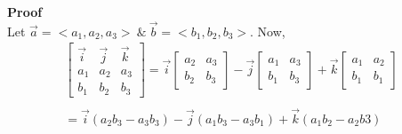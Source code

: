 \documentclass{article}
\begin{document}
  \textbf{Proof}\\
  Let $ \vec{ a } = < a_1, a_2, a_3> ~ \&~ \vec{ b } = < b_1, b_2, b_3>    $. Now,
  \[
    \begin{gathered}
    \begin{bmatrix}
      \vec{ i } & \vec{ j } & \vec{ k }\\
      a_1 &a_2 &a_3\\
      b_1 &b_2 &b_3
    \end{bmatrix}
    = \vec{ i } \begin{bmatrix}
      a_2 &a_3\\
      b_2 &b_3
    \end{bmatrix} - 
    \vec{ j } \begin{bmatrix}
      a_1 &a_3\\
      b_1 &b_3
    \end{bmatrix} + 
    \vec{ k } \begin{bmatrix}
      a_1 &a_2\\
      b_1 &b_1
    \end{bmatrix}\\
    ~\\
     = \vec{ i } (a_2b_3-a_3b_3) - \vec{ j } (a_1b_3 - a_3b_1) + \vec{ k }(a_1b_2 - a_2b3)
    \end{gathered}
  \]
\end{document}
